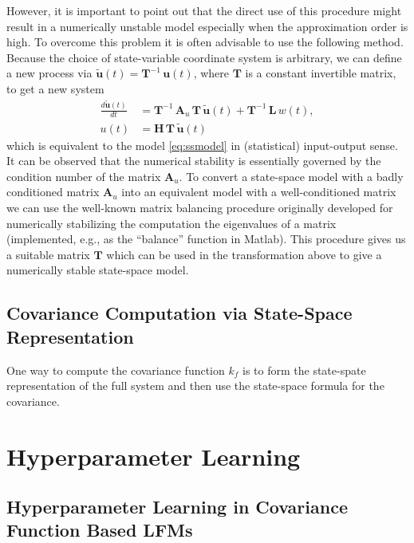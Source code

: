 \documentclass[journal]{IEEEtran}
\newcommand{\simo}[1]{{\color{red}#1}}
\begin{document}
However, it is important to point out that the direct use of this procedure might result in a numerically unstable model especially when the approximation order is high. To overcome this problem it is often advisable to use the following method. 
Because the choice of state-variable coordinate system is arbitrary, we can define a new process via $\tilde{\mathbf{u}}(t) = \mathbf{T}^{-1} \, \mathbf{u}(t)$, where $\mathbf{T}$ is a constant invertible matrix, to get a new system
%
\begin{equation}
\begin{split}
    \frac{d\tilde{\mathbf{u}}(t)}{dt}
    &= \mathbf{T}^{-1} \, \mathbf{A}_u \, \mathbf{T} \, \tilde{\mathbf{u}}(t)
    + \mathbf{T}^{-1} \, \mathbf{L} \, w(t), \\
   u(t) &= \mathbf{H} \, \mathbf{T} \, \tilde{\mathbf{u}}(t)
\end{split}
\end{equation}
%
which is equivalent to the model \eqref{eq:ssmodel} in (statistical) input-output sense. It can be observed that the numerical stability is essentially governed by the condition number of the matrix $\mathbf{A}_u$. To convert a state-space model with a badly conditioned matrix $\mathbf{A}_u$ into an equivalent model with a well-conditioned matrix we can use the well-known matrix balancing procedure
\cite{Parlett+Reinsch:1971}
originally developed for numerically stabilizing the computation the eigenvalues of a matrix (implemented, e.g., as the ``balance'' function in Matlab). This procedure gives us a suitable matrix $\mathbf{T}$ which can be used in the transformation above to give a numerically stable state-space model.

\subsection{Covariance Computation via State-Space Representation}
%
\simo{One way to compute the covariance function $k_f$ is to form the state-spate representation of the full system and then use the state-space formula for the covariance.}



\section{Hyperparameter Learning}
%
\subsection{Hyperparameter Learning in Covariance Function Based LFMs}
\end{document}
